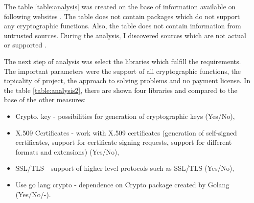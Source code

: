 \documentclass[
  digital, %
  notable,   %
  lof,     %
  lot,     %
]{fithesis3}
\begin{document}
The table \ref{table:analysis} was created on the base of information available on 
following websites \cite{security-golibrariesAndApps} \cite{cryptography-golibrariesAndApps} \cite{crypto-godoc} \cite{packages-thegoprogramminglanguage}. The 
table does not contain packages which do not support any cryptographic functions. Also, 
the table does not contain information from untrusted sources. During the analysis, I 
discovered sources which are not actual or supported \cite{puregolibs}.

The next step of analysis was select the libraries which fulfill the requirements. The important 
parameters were the support of all cryptographic functions, the topicality of project, the 
approach to solving problems and no payment license. In the table \ref{table:analysis2}, 
there are shown four libraries and compared to the base of the other measures:
\vskip0.1in
\begin{itemize}[leftmargin=2em,rightmargin=1em,itemsep=0.75\parskip,parsep=0em,topsep=0em,partopsep=0em]
\item Crypto. key - possibilities for generation of cryptographic keys (Yes/No),
\item X.509 Certificates - work with X.509 certificates (generation of self-signed certificates, support for certificate signing requests, support for different formats and extensions) (Yes/No),
\item SSL/TLS - support of higher level protocols such as SSL/TLS (Yes/No),
\item Use go lang crypto - dependence on Crypto package created by Golang (Yes/No/-).
\end{itemize}
\vskip0.1in

\end{document}
